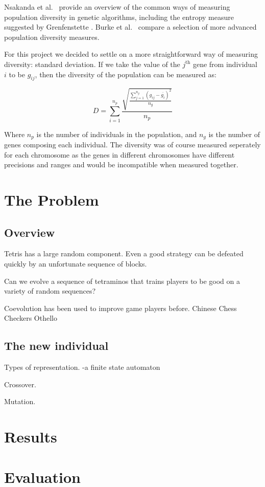 \documentclass[a4paper,11pt]{article}
\begin{document}
Nsakanda et al.\ \cite{nsakanda2007ensuring} provide an overview of the common
ways of measuring population diversity in genetic algorithms, including the
entropy measure suggested by Grenfenstette \cite{grefenstette1987incorporating}.
Burke et al.\ \cite{burke2003advanced} compare a selection of more advanced
population diversity measures.

For this project we decided to settle on a more straightforward way of measuring
diversity: standard deviation.
If we take the value of the $j^\textrm{th}$ gene from individual $i$ to be
$g_{ij}$, then the diversity of the population can be measured as:

\begin{equation}
  D = \sum_{i=1}^{n_p} \frac{\sqrt{\frac{\sum_{j=1}^{n_g} (g_{ij} - \overline{g_i})^2 }{n_g}} }{n_p}
\end{equation}

Where $n_p$ is the number of individuals in the population, and $n_g$ is the
number of genes composing each individual.
The diversity was of course measured seperately for each chromosome as the
genes in different chromosomes have different precisions and ranges and would be
incompatible when measured together.

\section{The Problem}

\subsection{Overview}

Tetris has a large random component.
Even a good strategy can be defeated quickly by an unfortunate sequence of blocks.

Can we evolve a sequence of tetraminos that trains players to be good on a
variety of random sequences?

Coevolution has been used to improve game players before.
Chinese Chess \cite{ong2007discovering}
Checkers \cite{chellapilla1999evolving}
Othello \cite{moriarty1995discovering}

\subsection{The new individual}

Types of representation.
-a ﬁnite state automaton

Crossover.

Mutation.

\section{Results}

\section{Evaluation}


\end{document}
